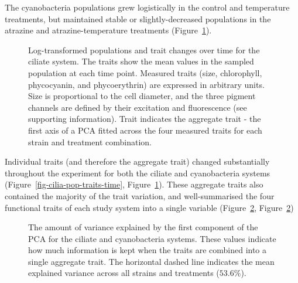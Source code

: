 \documentclass[
  letterpaper,
  DIV=11,
  numbers=noendperiod]{scrartcl}
\begin{document}
The cyanobacteria populations grew logistically in the control and
temperature treatments, but maintained stable or slightly-decreased
populations in the atrazine and atrazine-temperature treatments
(Figure~\ref{fig-cyano-pop-traits-time}).

\begin{figure}


\caption{\label{fig-cyano-pop-traits-time}Log-transformed populations
and trait changes over time for the ciliate system. The traits show the
mean values in the sampled population at each time point. Measured
traits (size, chlorophyll, phycocyanin, and phycoerythrin) are expressed
in arbitrary units. Size is proportional to the cell diameter, and the
three pigment channels are defined by their excitation and fluorescence
(see supporting information). Trait indicates the aggregate trait - the
first axis of a PCA fitted across the four measured traits for each
strain and treatment combination.}

\end{figure}%

Individual traits (and therefore the aggregate trait) changed
substantially throughout the experiment for both the ciliate and
cyanobacteria systems (Figure~\ref{fig-cilia-pop-traits-time},
Figure~\ref{fig-cyano-pop-traits-time}). These aggregate traits also
contained the majority of the trait variation, and well-summarised the
four functional traits of each study system into a single variable
(Figure~\ref{fig-PC-var-explained}, Figure~\ref{fig-PC-var-explained})

\begin{figure}


\caption{\label{fig-PC-var-explained}The amount of variance explained by
the first component of the PCA for the ciliate and cyanobacteria
systems. These values indicate how much information is kept when the
traits are combined into a single aggregate trait. The horizontal dashed
line indicates the mean explained variance across all strains and
treatments (\(53.6\%\)).}

\end{figure}%
\end{document}
